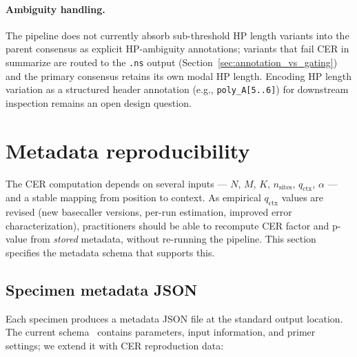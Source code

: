 \documentclass[11pt]{article}
\begin{document}
\paragraph{Ambiguity handling.} The pipeline does not currently absorb
sub-threshold HP length variants into the parent consensus as explicit
HP-ambiguity annotations; variants that fail CER in summarize are routed to
the \texttt{.ns} output (Section~\ref{sec:annotation_vs_gating}) and the
primary consensus retains its own modal HP length. Encoding HP length
variation as a structured header annotation (e.g., \texttt{poly\_A[5..6]})
for downstream inspection remains an open design question.

\section{Metadata reproducibility}
\label{sec:reproducibility}

The CER computation depends on several inputs --- $N$, $M$, $K$,
$n_\text{sites}$, $q_\text{ctx}$, $\alpha$ --- and a stable mapping from
position to context. As empirical $q_\text{ctx}$ values are revised (new
basecaller versions, per-run estimation, improved error characterization),
practitioners should be able to recompute CER factor and p-value from
\emph{stored} metadata, without re-running the pipeline. This section
specifies the metadata schema that supports this.

\subsection{Specimen metadata JSON}

Each specimen produces a metadata JSON file at the standard output location.
The current schema~\cite{speconsense} contains parameters, input information,
and primer settings; we extend it with CER reproduction data:
\end{document}
